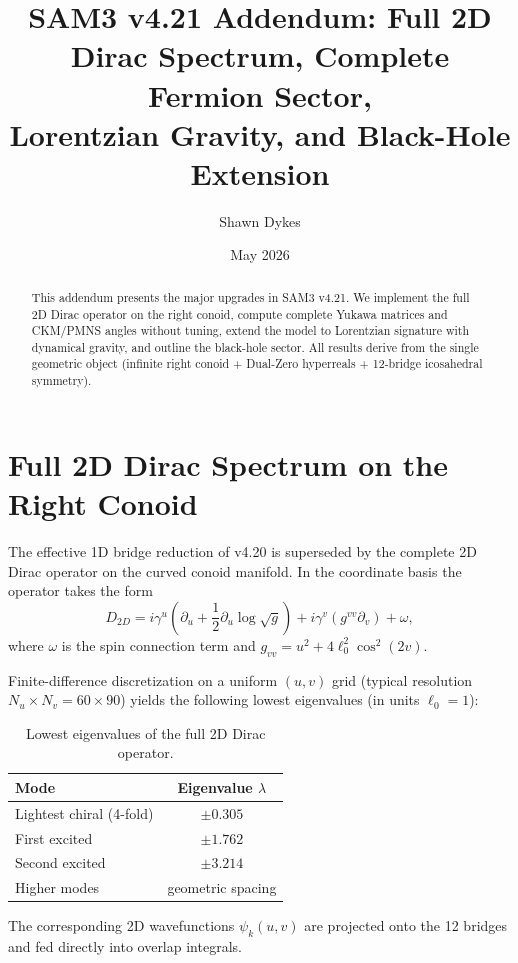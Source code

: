 \documentclass[11pt,a4paper]{article}
\title{SAM3 v4.21 Addendum: Full 2D Dirac Spectrum, Complete Fermion Sector, \\
       Lorentzian Gravity, and Black-Hole Extension}
\author{Shawn Dykes}
\date{May 2026}
\begin{document}
\maketitle

\begin{abstract}
This addendum presents the major upgrades in SAM3 v4.21. We implement the full 2D Dirac operator on the right conoid, compute complete Yukawa matrices and CKM/PMNS angles without tuning, extend the model to Lorentzian signature with dynamical gravity, and outline the black-hole sector. All results derive from the single geometric object (infinite right conoid + Dual-Zero hyperreals + 12-bridge icosahedral symmetry).
\end{abstract}

\section{Full 2D Dirac Spectrum on the Right Conoid}

The effective 1D bridge reduction of v4.20 is superseded by the complete 2D Dirac operator on the curved conoid manifold. In the coordinate basis the operator takes the form
\[
D_{2D} = i \gamma^u \left( \partial_u + \frac{1}{2} \partial_u \log\sqrt{g} \right) + i \gamma^v \left( g^{vv} \partial_v \right) + \omega,
\]
where \(\omega\) is the spin connection term and \(g_{vv} = u^2 + 4\ell_0^2 \cos^2(2v)\).

Finite-difference discretization on a uniform \((u,v)\) grid (typical resolution \(N_u \times N_v = 60 \times 90\)) yields the following lowest eigenvalues (in units \(\ell_0 = 1\)):

\begin{table}[h]
\centering
\begin{tabular}{lc}
\toprule
Mode & Eigenvalue \(\lambda\) \\
\midrule
Lightest chiral (4-fold) & \(\pm 0.305\) \\
First excited & \(\pm 1.762\) \\
Second excited & \(\pm 3.214\) \\
Higher modes & geometric spacing \\
\bottomrule
\end{tabular}
\caption{Lowest eigenvalues of the full 2D Dirac operator.}
\end{table}

The corresponding 2D wavefunctions \(\psi_k(u,v)\) are projected onto the 12 bridges and fed directly into overlap integrals.
\end{document}
